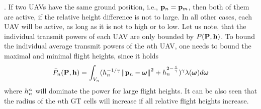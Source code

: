 \documentclass[smallabstract,smallcaptions]{dccpaper}
\newenvironment{remark}{\par\vspace{1.5ex}\noindent{\em Remark\/}.}{\par\vspace{1.5ex}}
\newcommand{\df}{\ensuremath{\lam}}         %
\newcommand{\gP}{\ensuremath{\vP}}          %
\newcommand{\gp}{\ensuremath{\vp}}          %
\newcommand{\abPo}{\ensuremath{\bar{P}}}  %
\newcommand{\bH}{\ensuremath{\vh}}          %
\begin{document}
\begin{remark}
  If two UAVs have the same ground position, i.e., $\gp_n=\gp_m$, then both of them are active, if the relative height
  difference is not to large. In all other cases, each UAV will be active, as long as it is not to high or to low. 
  Let us note, that the individual transmit powers of each UAV are only bounded by $P(\gP,\bH)$. To bound the individual
  average transmit powers of the $n$th UAV, one needs to bound the maximal and minimal flight heights, since it holds
  \begin{align}
    \abPo_n(\gP,\bH)= \int_{V_n} (h_n^{-1/\gam}\Norm{\gp_n-\vome}^2 + h_n^{2-\frac{1}{\gam}})^\gam \df(\vome)d\vome
  \end{align}
  where $h_n^{\alpha}$ will dominate the power for large flight heights.  It can be also seen that the radius of the $n$th
  GT cells will increase if all relative flight heights increase. 
\end{remark}
%
\end{document}
